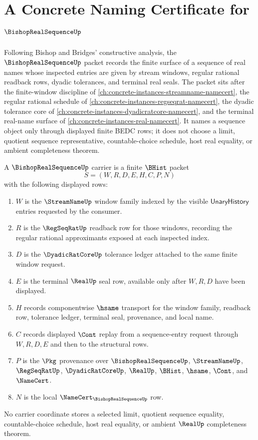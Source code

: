 \chapter{A Concrete Naming Certificate for $\BishopRealSequenceUp$}
\label{ch:concrete-instances-bishop-real-sequence-namecert}

Following Bishop and Bridges' constructive analysis, the $\BishopRealSequenceUp$ packet records the finite surface of a sequence of real names whose inspected entries are given by stream windows, regular rational readback rows, dyadic tolerances, and terminal real seals. The packet sits after the finite-window discipline of \autoref{ch:concrete-instances-streamname-namecert}, the regular rational schedule of \autoref{ch:concrete-instances-regseqrat-namecert}, the dyadic tolerance core of \autoref{ch:concrete-instances-dyadicratcore-namecert}, and the terminal real-name surface of \autoref{ch:concrete-instances-real-namecert}. It names a sequence object only through displayed finite BEDC rows; it does not choose a limit, quotient sequence representative, countable-choice schedule, host real equality, or ambient completeness theorem.

\begin{definition}
\label{def:bishop-real-sequence-carrier}
A $\BishopRealSequenceUp$ carrier is a finite $\BHist$ packet
$$
S=(W,R,D,E,H,C,P,N)
$$
with the following displayed rows:
\begin{enumerate}
\item $W$ is the $\StreamNameUp$ window family indexed by the visible $\mathsf{UnaryHistory}$ entries requested by the consumer.
\item $R$ is the $\RegSeqRatUp$ readback row for those windows, recording the regular rational approximants exposed at each inspected index.
\item $D$ is the $\DyadicRatCoreUp$ tolerance ledger attached to the same finite window request.
\item $E$ is the terminal $\RealUp$ seal row, available only after $W,R,D$ have been displayed.
\item $H$ records componentwise $\hsame$ transport for the window family, readback row, tolerance ledger, terminal seal, provenance, and local name.
\item $C$ records displayed $\Cont$ replay from a sequence-entry request through $W,R,D,E$ and then to the structural rows.
\item $P$ is the $\Pkg$ provenance over $\BishopRealSequenceUp$, $\StreamNameUp$, $\RegSeqRatUp$, $\DyadicRatCoreUp$, $\RealUp$, $\BHist$, $\hsame$, $\Cont$, and $\NameCert$.
\item $N$ is the local $\NameCert_{\BishopRealSequenceUp}$ row.
\end{enumerate}
No carrier coordinate stores a selected limit, quotient sequence equality, countable-choice schedule, host real equality, or ambient $\RealUp$ completeness theorem.
\end{definition}

